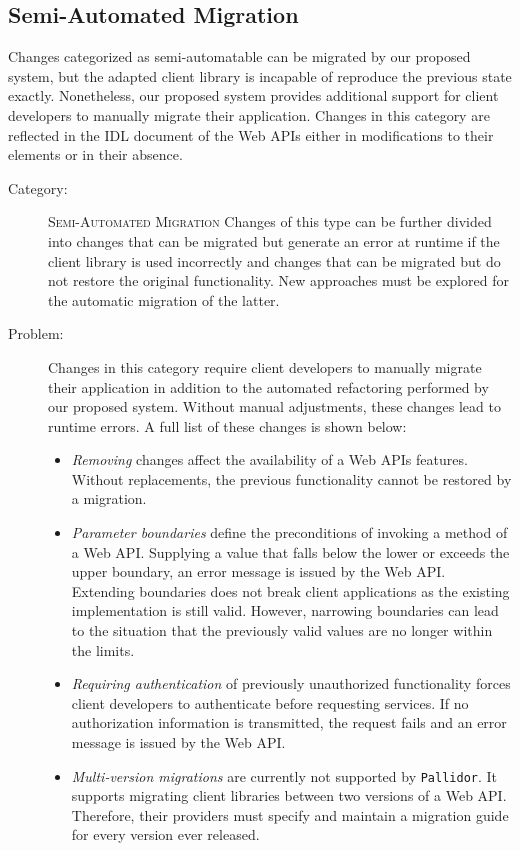 \subsection{Semi-Automated Migration}\label{subsec:EvalSemiAutomated}
Changes categorized as semi-automatable can be migrated by our proposed system, but the adapted client library is incapable of reproduce the previous state exactly. Nonetheless, our proposed system provides additional support for client developers to manually migrate their application. Changes in this category are reflected in the IDL document of the Web APIs either in modifications to their elements or in their absence.


\begin{description}
	\item[Category:] \textsc{Semi-Automated Migration} \newline Changes of this type can be further divided into changes that can be migrated but generate an error at runtime if the client library is used incorrectly and changes that can be migrated but do not restore the original functionality. New approaches must be explored for the automatic migration of the latter.
	\item[Problem:] Changes in this category require client developers to manually migrate their application in addition to the automated refactoring performed by our proposed system. Without manual adjustments, these changes lead to runtime errors. A full list of these changes is shown below:
	\begin{itemize}
		\item \textit{Removing} changes affect the availability of a Web APIs features. Without replacements, the previous functionality cannot be restored by a migration. 
		\item \textit{Parameter boundaries} define the preconditions of invoking a method of a Web API. Supplying a value that falls below the lower or exceeds the upper boundary, an error message is issued by the Web API. Extending boundaries does not break client applications as the existing implementation is still valid. However, narrowing boundaries can lead to the situation that the previously valid values are no longer within the limits.
		\item \textit{Requiring authentication} of previously unauthorized functionality forces client developers to authenticate before requesting services. If no authorization information is transmitted, the request fails and an error message is issued by the Web API.
		\item \textit{Multi-version migrations} are currently not supported by \texttt{Pallidor}. It supports migrating client libraries between two versions of a Web API. Therefore, their providers must specify and maintain a migration guide for every version ever released.

\end{itemize}
\end{description}
